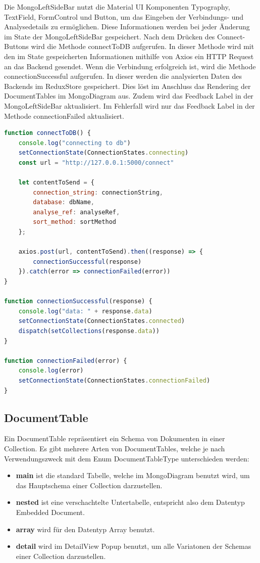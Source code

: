 Die  MongoLeftSideBar nutzt die Material UI Komponenten Typography, TextField, FormControl und Button, um das Eingeben der Verbindungs- und Analysedetails zu ermöglichen.
Diese Informationen werden bei jeder Änderung im State der MongoLeftSideBar gespeichert.
Nach dem Drücken des Connect-Buttons wird die Methode connectToDB aufgerufen.
In dieser Methode wird mit den im State gespeicherten Informationen mithilfe von Axios ein HTTP Request an das Backend gesendet.
Wenn die Verbindung erfolgreich ist, wird die Methode connectionSuccessful aufgerufen.
In dieser werden die analysierten Daten des Backends im ReduxStore gespeichert.
Dies löst im Anschluss das Rendering der DocumentTables im MongoDiagram aus.
Zudem wird das Feedback Label in der MongoLeftSideBar aktualisiert.
Im Fehlerfall wird nur das Feedback Label in der Methode connectionFailed aktualisiert.


\begin{lstlisting}[language=JavaScript, caption={MongoLeftSideBar.connectToDB},label={lst:mongo_left_side_bar_connect_to_db}]
function connectToDB() {
    console.log("connecting to db")
    setConnectionState(ConnectionStates.connecting)
    const url = "http://127.0.0.1:5000/connect"

    let contentToSend = {
        connection_string: connectionString,
        database: dbName,
        analyse_ref: analyseRef,
        sort_method: sortMethod
    };

    axios.post(url, contentToSend).then((response) => {
        connectionSuccessful(response)
    }).catch(error => connectionFailed(error))
}

function connectionSuccessful(response) {
    console.log("data: " + response.data)
    setConnectionState(ConnectionStates.connected)
    dispatch(setCollections(response.data))
}

function connectionFailed(error) {
    console.log(error)
    setConnectionState(ConnectionStates.connectionFailed)
}
\end{lstlisting}

\subsection{DocumentTable}
\label{sub:fe_document_table}

Ein DocumentTable repräsentiert ein Schema von Dokumenten in einer Collection.
Es gibt mehrere Arten von DocumentTables, welche je nach Verwendungszweck mit dem Enum DocumentTableType unterschieden werden:
\begin{itemize}
    \item \textbf{main} ist die standard Tabelle, welche im MongoDiagram benutzt wird, um das Hauptschema einer Collection darzustellen.
    \item \textbf{nested} ist eine verschachtelte Untertabelle, entspricht also dem Datentyp Embedded Document.
    \item \textbf{array} wird für den Datentyp Array benutzt.
    \item \textbf{detail} wird im DetailView Popup benutzt, um alle Variatonen der Schemas einer Collection darzustellen.
\end{itemize}

